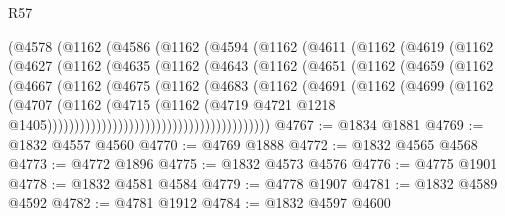 \begin{lexlean}{R57}
\begin{coremodule}
                (@4578
                  (@1162
                    (@4586
                      (@1162
                        (@4594
                          (@1162
                            (@4611
                              (@1162
                                (@4619
                                  (@1162
                                    (@4627
                                      (@1162
                                        (@4635
                                          (@1162
                                            (@4643
                                              (@1162
                                                (@4651
                                                  (@1162
                                                    (@4659
                                                      (@1162
                                                        (@4667
                                                          (@1162
                                                            (@4675
                                                              (@1162
                                                                (@4683
                                                                  (@1162
                                                                    (@4691
                                                                      (@1162
                                                                        (@4699
                                                                          (@1162
                                                                            (@4707
                                                                              (@1162
                                                                                (@4715
                                                                                  (@1162
                                                                                    (@4719
                                                                                      @4721
                                                                                      @1218
                                                                                      @1405)))))))))))))))))))))))))))))))))))))))))
@4767 := @1834 @1881
@4769 := @1832 @4557 @4560
@4770 := @4769 @1888
@4772 := @1832 @4565 @4568
@4773 := @4772 @1896
@4775 := @1832 @4573 @4576
@4776 := @4775 @1901
@4778 := @1832 @4581 @4584
@4779 := @4778 @1907
@4781 := @1832 @4589 @4592
@4782 := @4781 @1912
@4784 := @1832 @4597 @4600

\end{coremodule}
\end{lexlean}
